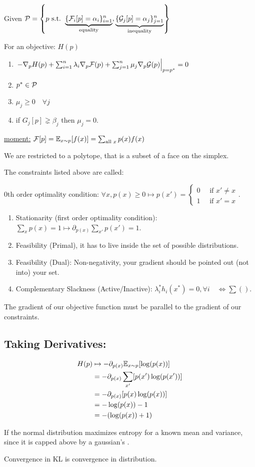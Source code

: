 Given $\mathcal{P} = \left\{p\text{ s.t. } \underbrace{\{\mathcal{F}_i[p]=\alpha_i\}_{i=1}^n}_{\text{equality}}, \underbrace{\{\mathcal{G}_j[p]=\alpha_j\}_{j=1}^n}_{\text{inequality}} \right\}$

For an objective: $H(p)$
\begin{enumerate}
    \item $\left.-\nabla_p H(p) + \sum_{i=1}^n \lambda_i \nabla_p \mathcal{F}(p) + \sum_{j=1}^n \mu_j \nabla_p \mathcal{G}(p)\right|_{p=p^\ast}=0$
    \item $p^\ast\in\mathcal{P}$
    \item $\mu_j\geq0\quad\forall j$
    \item if $G_j[p] \gneq \beta_j$ then $\mu_j=0$.
\end{enumerate}

\underline{moment:} $\mathcal{F}[p] = \mathbb{E}_{x\sim p}[f(x)] = \sum_{\text{all $x$}} p(x) f(x)$

We are restricted to a polytope, that is a subset of a face on the simplex. 

The constraints listed above are called:

0th order optimality condition: $\forall x, p(x)\geq 0\mapsto p(x')=\begin{cases}
    0 \quad \text{ if } x'\ne x
    \\
    1 \quad \text{ if } x' = x
\end{cases}$.
\begin{enumerate}
    \item Stationarity (first order optimality condition): 
    $\sum_x p(x)=1
    \mapsto\partial_{p(x)} \sum_{x'} p(x')=1$.
    \item Feasibility (Primal), it has to live inside the set of possible distributions.
    \item Feasibility (Dual): Non-negativity, your gradient should be pointed out (not into) your set.
    \item Complementary Slackness (Active/Inactive): $\lambda_i^* h_i\left(x^*\right)=0, \forall i\quad \iff \sum()$.
\end{enumerate}

The gradient of our objective function must be parallel to the gradient of our constraints.

\subsection{Taking Derivatives:}
\begin{align*}
H(p)
&\mapsto -\partial_{p(x)} \mathbb{E}_{x\sim p}[\log(p(x))]  \\
&= -\partial_{p(x)} \sum_{x'}[p(x') \log(p(x'))]  \\
&= -\partial_{p(x)} [p(x) \log(p(x))]  \\
&= -\log(p(x)) - 1 \\
&= -(\log(p(x)) + 1)
\end{align*}





If the normal distribution maximizes entropy for a known mean and variance, since it is capped above by a gaussian's    .

Convergence in KL is convergence in distribution.
